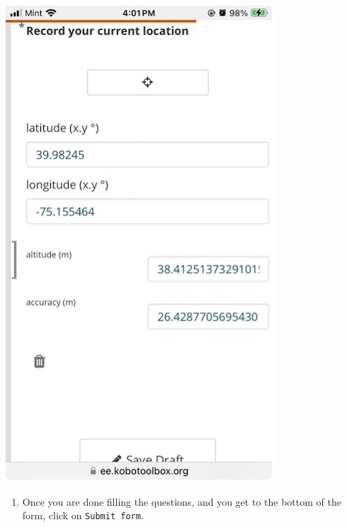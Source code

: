 \documentclass[
  letterpaper,
  DIV=11,
  numbers=noendperiod]{scrartcl}
\providecommand{\tightlist}{%
  \setlength{\itemsep}{0pt}\setlength{\parskip}{0pt}}\usepackage{longtable,booktabs,array}
\begin{document}
\includegraphics{kobotoolbox_tutorial_files/img/img17.jpg}

\begin{enumerate}
\def\labelenumi{\arabic{enumi}.}
\setcounter{enumi}{3}
\tightlist
\item
  Once you are done filling the questions, and you get to the bottom of
  the form, click on \texttt{Submit\ form}.
\end{enumerate}
\end{document}
